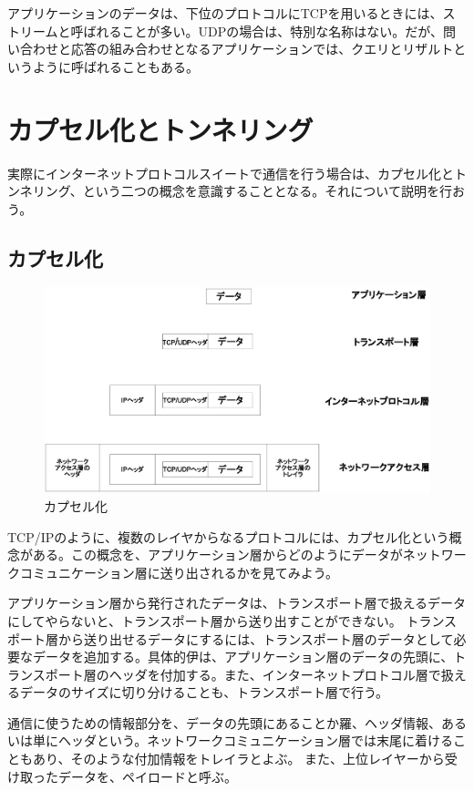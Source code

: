アプリケーションのデータは、下位のプロトコルにTCPを用いるときには、ストリームと呼ばれることが多い。UDPの場合は、特別な名称はない。だが、問い合わせと応答の組み合わせとなるアプリケーションでは、クエリとリザルトというように呼ばれることもある。

\section{カプセル化とトンネリング}

実際にインターネットプロトコルスイートで通信を行う場合は、カプセル化とトンネリング、という二つの概念を意識することとなる。それについて説明を行おう。

\subsection{カプセル化}

\begin{figure}
	\includegraphics[width=12cm,clip]{draw/encupselation.eps}
	\caption{カプセル化}
	\label{fig:encupselation}
\end{figure}

TCP/IPのように、複数のレイヤからなるプロトコルには、カプセル化という概念がある。この概念を、アプリケーション層からどのようにデータがネットワークコミュニケーション層に送り出されるかを見てみよう。

アプリケーション層から発行されたデータは、トランスポート層で扱えるデータにしてやらないと、トランスポート層から送り出すことができない。
トランスポート層から送り出せるデータにするには、トランスポート層のデータとして必要なデータを追加する。具体的伊は、アプリケーション層のデータの先頭に、トランスポート層のヘッダを付加する。また、インターネットプロトコル層で扱えるデータのサイズに切り分けることも、トランスポート層で行う。

通信に使うための情報部分を、データの先頭にあることか羅、ヘッダ情報、あるいは単にヘッダという。ネットワークコミュニケーション層では末尾に着けることもあり、そのような付加情報をトレイラとよぶ。
また、上位レイヤーから受け取ったデータを、ペイロードと呼ぶ。

